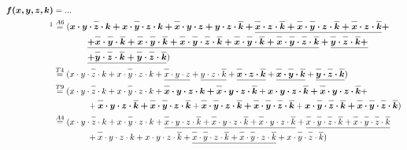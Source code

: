 \documentclass{article}
\newcommand*{\oline}[1]{\overline{#1\mathstrut}}
\newcommand{\bigspace}{\quad\quad\quad\quad}
\begin{document}
\begin{align*}
  \bm{f(x,y,z,k)} &= ...\\
  \footnotemark[1]&\overset{A6}{=} (\bm{x \cdot y \cdot \oline{z} \cdot k + x \cdot \oline{y} \cdot z \cdot k + \oline{x} \cdot y \cdot z + y \cdot z \cdot \oline{k} + \underline{\oline{x} \cdot z \cdot \oline{k} + \oline{x} \cdot \oline{y} \cdot z \cdot \oline{k} + \oline{x} \cdot z \cdot \oline{k}} +}\\
  &\bigspace \bm{\underline{+ \oline{x} \cdot \oline{y} \cdot \oline{k} + \oline{x} \cdot \oline{y} \cdot \oline{k} + \oline{x} \cdot \oline{y} \cdot \oline{z} \cdot \oline{k} + \oline{x} \cdot \oline{y} \cdot \oline{k} + \oline{x} \cdot \oline{y} \cdot \oline{z} \cdot \oline{k}} + \underline{\oline{y} \cdot \oline{z} \cdot \oline{k} +}}\\
  &\bigspace \bm{\underline{+ \oline{y} \cdot \oline{z} \cdot \oline{k} + \oline{y} \cdot \oline{z} \cdot \oline{k}}})\\
  &\overset{T4}{=} (x \cdot y \cdot \oline{z} \cdot k + x \cdot \oline{y} \cdot z \cdot k + \underline{\oline{x} \cdot y \cdot z} + \underline{y \cdot z \cdot \oline{k}} + \underline{\bm{\oline{x} \cdot z \cdot \oline{k}}} + \underline{\bm{\oline{x} \cdot \oline{y} \cdot \oline{k}}} + \underline{\bm{\oline{y} \cdot \oline{z} \cdot \oline{k}}})\\
  &\overset{T9}{=} (x \cdot y \cdot \oline{z} \cdot k + x \cdot \oline{y} \cdot z \cdot k + \bm{\oline{x} \cdot y \cdot z \cdot k + \oline{x} \cdot y \cdot z \cdot \oline{k}} + \bm{x \cdot y \cdot z \cdot \oline{k} + \oline{x} \cdot y \cdot z \cdot \oline{k}} +\\
  &\bigspace + \bm{\oline{x} \cdot y \cdot z \cdot \oline{k} + \oline{x} \cdot \oline{y} \cdot z \cdot \oline{k}} + \bm{\oline{x} \cdot \oline{y} \cdot z \cdot \oline{k} + \oline{x} \cdot \oline{y} \cdot \oline{z} \cdot \oline{k}} + \bm{x \cdot \oline{y} \cdot \oline{z} \cdot \oline{k} + \oline{x} \cdot \oline{y} \cdot \oline{z} \cdot \oline{k}})\\
  &\overset{A4}{=} (x \cdot y \cdot \oline{z} \cdot k + x \cdot \oline{y} \cdot z \cdot k + \underline{\oline{x} \cdot y \cdot z \cdot \oline{k} + \oline{x} \cdot y \cdot z \cdot \oline{k} + \oline{x} \cdot y \cdot z \cdot \oline{k}} + \underline{\oline{x} \cdot \oline{y} \cdot \oline{z} \cdot \oline{k} + \oline{x} \cdot \oline{y} \cdot \oline{z} \cdot \oline{k}}\\
  &\bigspace + \oline{x} \cdot y \cdot z \cdot k + x \cdot y \cdot z \cdot \oline{k} + \underline{\oline{x} \cdot \oline{y} \cdot z \cdot \oline{k} + \oline{x} \cdot \oline{y} \cdot z \cdot \oline{k}} + x \cdot \oline{y} \cdot \oline{z} \cdot \oline{k})\\

\end{align*}
\end{document}

